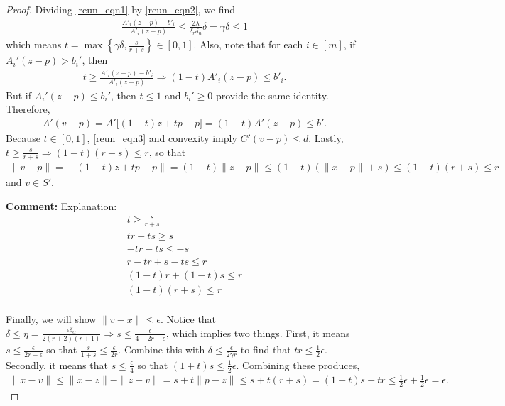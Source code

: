 \documentclass{article}
\newenvironment{comment}
  {\par\medskip
   \color{red}%
   \begin{framed}
   \textbf{Comment: }\ignorespaces}
 {\end{framed}
  \medskip}
\theoremstyle{case}
\numberwithin{theorem}{subsection}
\begin{document}
\begin{proof}
Dividing \cref{reun_eqn1} by \cref{reun_eqn2}, we find
\begin{align*}
\frac{A'_i (z - p) - b'_i}{A'_i (z - p)} \le \frac{2\lambda}{\delta_r \delta_u}\delta = \gamma \delta \le 1
\end{align*}
which means $t = \max\left\{\gamma \delta, \frac{s}{r+s}\right\} \in [0, 1]$.
Also, note that for each $i \in [m]$, if $A_i'(z - p) > b_i'$, then
\begin{align*}
t \ge \frac{A'_i (z - p) - b'_i}{A'_i (z - p)}
\Longrightarrow (1-t) A'_i (z - p) \le b'_i.
\end{align*}
But if $A_i'(z - p) \le b_i'$, then $t \le 1$ and $b_i' \ge 0$ provide the same identity.
Therefore, 
\begin{align*}
A'(v - p) = A' \bigg[(1-t) z + tp - p\bigg] = (1-t) A' (z - p) \le b'.
\end{align*}
Because $t \in [0, 1]$, \cref{reun_eqn3} and convexity imply $C'(v - p) \le d$.
Lastly, $t \ge \frac{s}{r + s} \Longrightarrow (1 - t) \left(r + s\right) \le r$, so that
\begin{align*}
\|v - p\| = \|(1-t)z + t p - p\| = (1 - t) \|z - p\| \le (1 - t) \left(\|x - p\| + s\right) \le (1 - t) \left(r + s\right) \le r
\end{align*}
and $v \in S'$.
\begin{comment}
Explanation:
\begin{align*}
t \ge \frac{s}{r + s} \\
 tr + ts \ge s \\
- tr - ts \le -s \\
r - tr + s - ts \le r \\
(1 - t) r + (1 - t)s \le r \\
(1 - t) \left(r + s\right) \le r \\
\end{align*}
\end{comment}

Finally, we will show $\|v - x\| \le \epsilon$.
Notice that $\delta \le \eta = \frac{\epsilon\delta_{\alpha}}{2(r+2)(r + 1)} \Longrightarrow s \le \frac{\epsilon}{4 + 2r - \epsilon}$, which implies two things.
First, it means $s \le \frac{\epsilon}{2r - \epsilon}$ so that
$\frac {s}{1 + s} \le \frac {\epsilon} {2r}. $
Combine this with $\delta \le \frac {\epsilon} {2\gamma r}$ to find that $tr \le \frac 1 2 \epsilon$.
Secondly, it means that
$s \le \frac{\epsilon}{4}$ so that $(1 + t)s \le \frac 1 2 \epsilon$.
Combining these produces,
\begin{align*}
\|x - v\| 
\le \|x - z\| - \|z - v\| 
= s + t \|p - z\| 
\le s + t \left(r + s\right) 
= (1 + t)s + tr
\le \frac 1 2 \epsilon + \frac 1 2 \epsilon = \epsilon.
\end{align*}


\end{proof}
\end{document}
